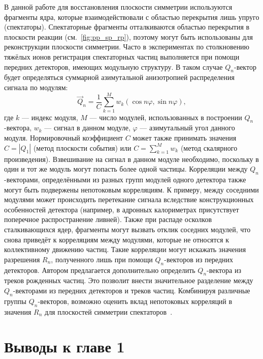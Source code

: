 В данной работе для восстановления плоскости симметрии используются фрагменты ядра, которые взаимодействовали с областью перекрытия лишь упруго (спектаторы). 
Спектаторные фрагменты отталкиваются областью перекрытия в плоскости реакции (см.~\ref{fig:pp_sp_rp}), поэтому могут быть использованы для реконструкции плоскости симметрии. 
Часто в экспериментах по столкновению тяжёлых ионов регистрация спектаторных частиц выполняется при помощи передних детекторов, имеющих модульную структуру. 
В таком случае $Q_n$-вектор будет определяться суммарной азимутальной анизотропией распределения сигнала по модулям:
%
\begin{equation}
    \vec{Q}_n  = \frac{1}{C} \sum_{k=1}^M w_k ( \cos n \varphi, \sin n \varphi ),
    \label{eq:module_qn}
\end{equation}
%
где $k$ --- индекс модуля, $M$ --- число модулей, использованных в построении $Q_n$-вектора, $w_k$ --- сигнал в данном модуле, $\varphi$ --- азимутальный угол данного модуля. 
Нормировочный коэффициент $C$ может также принимать значения $C=|Q_1|$ (метод плоскости события) или $C=\sum_{k=1}^M w_k$ (метод скалярного произведения).
Взвешивание на сигнал в данном модуле необходимо, поскольку в один и тот же модуль могут попасть более одной частицы.
Корреляции между $Q_n$-векторами, определёнными из разных групп модулей одного детектора также могут быть подвержены непотоковым корреляциям.
К примеру, между соседними модулями может происходить перетекание сигнала вследствие конструкционных особенностей детектора (например, в адронных калориметрах присутствует поперечное распространение ливней).
Также при распаде осколков сталкивающихся ядер, фрагменты могут вызвать отклик соседних модулей, что снова приведёт к корреляциям между модулями, которые не относятся к коллективному движению частиц.
Такие корреляции могут искажать значения разрешения $R_n$, полученного лишь при помощи $Q_n$-векторов из передних детекторов.
Автором предлагается дополнительно определить $Q_n$-вектора из треков рожденных частиц.
Это позволит внести значительное разделение между $Q_n$-векторами из передних детекторов и треков частиц.
Комбинируя различные группы $Q_n$-векторов, возможно оценить вклад непотоковых корреляций в значения $R_n$ для плоскостей симметрии спектаторов~\cite{Mamaev:2023fpr,Mamaev:2023yhz,Mamaev:2024}.

\section{Выводы к главе 1}

